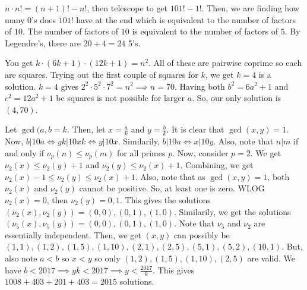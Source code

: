 \documentclass[11pt]{article}
\begin{document}

\begin{sol}
$n\cdot n! = (n+1)!-n!$, then telescope to get $101!-1!$. Then, we are finding how many $0$'s does $101!$ have at the end which is equivalent to the number of factors of $10$. The number of factors of $10$ is equivalent to the number of factors of $5$. By Legendre's, there are $20+4=\boxed{24}$ 5's.
\end{sol}



\begin{sol}
You get $k\cdot (6k+1)\cdot (12k+1)=n^2$. All of these are pairwise coprime so each are squares. Trying out the first couple of squares for $k$, we get $k=4$ is a solution. $k=4$ gives $2^2\cdot 5^2\cdot 7^2=n^2\implies n = 70$. Having both $b^2=6a^2+1$ and $c^2=12a^2+1$ be squares is not possible for larger $a$. So, our only solution is $\boxed{(4,70)}$.
\end{sol}
 

\begin{sol}
Let $\gcd(a,b=k$. Then, let $x=\frac{a}{k}$ and $y=\frac{b}{k}$. It is clear that $\gcd(x,y)=1$. Now, $b|10a\iff yk|10xk\iff y|10x$. Similarily, $b|10a\iff x|10y$. Also, note that $n|m$ if and only if $\nu_{p}(n)\leq \nu_{p}(m)$ for all primes $p$. Now, consider $p=2$. We get $\nu_{2}(x)\leq \nu_{2}(y)+1$ and $\nu_{2}(y)\leq \nu_{2}(x)+1$. Combining, we get $\nu_{2}(x)-1\leq \nu_{2}(y)\leq \nu_{2}(x)+1$. Also, note that as $\gcd(x,y)=1$, both $\nu_{2}(x)$ and $\nu_{2}(y)$ cannot be positive. So, at least one is zero. WLOG $\nu_{2}(x)=0$, then $\nu_{2}(y)=0,1$. This gives the solutions $(\nu_{2}(x),\nu_{2}(y))=(0,0),(0,1),(1,0)$. Similarily, we get the solutions $(\nu_{5}(x),\nu_{5}(y))=(0,0),(0,1),(1,0)$. Note that $\nu_{5}$ and $\nu_{2}$ are essentially independent. Then, we get $(x,y)$ can possibly be $(1,1),(1,2),(1,5),(1,10),(2,1),(2,5),(5,1),(5,2),(10,1)$. But, also note $a<b$ so $x<y$ so only $(1,2),(1,5),(1,10),(2,5)$ are valid. We have $b<2017\implies yk<2017\implies y < \frac{2017}{k}$. This gives $1008+403+201+403=\boxed{2015}$ solutions.
\end{sol}
\end{document}
